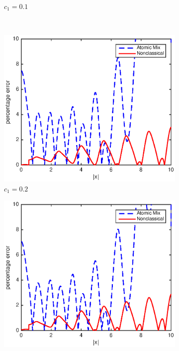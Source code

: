 \documentclass[12pt]{article}
\begin{document}
{\begin{figure}[p]
\begin{subfigure}{0.495\textwidth}
        \caption{$c_1 = 0.1$}
        \label{figerrA10}
    \end{subfigure}
    \\
    \centering
    \begin{subfigure}{0.495\textwidth}
        \centering
        \includegraphics[width=\textwidth]{NSE_err_A20.eps}
        \caption{$c_1 = 0.2$}
        \label{figerrA20}
    \end{subfigure}
    \hfill
    \begin{subfigure}{0.495\textwidth}
        \centering
        \includegraphics[width=\textwidth]{NSE_err_A30.eps}

\end{subfigure}
\end{figure}}
\end{document}
